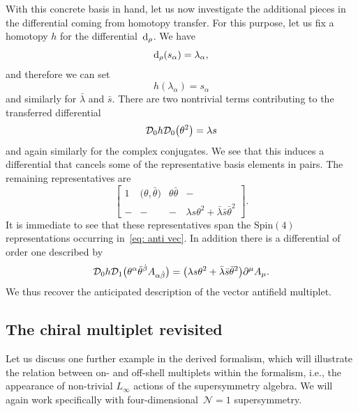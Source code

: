 \documentclass[pdftex]{sigma}
\numberwithin{equation}{section}
\def\d{{\rm d}}
\begin{document}
With this concrete basis in hand, let us now investigate the additional pieces in the differential coming from homotopy transfer. For this purpose, let us fix a homotopy $h$ for the differential~$\d_\rho$. We have
\begin{equation*}
\d_\rho (s_\alpha) = \lambda_\alpha ,
\end{equation*}
and therefore we can set
\begin{equation*}
h(\lambda_\alpha) = s_\alpha
\end{equation*}
and similarly for $\bar{\lambda}$ and $\bar{s}$. There are two nontrivial terms contributing to the transferred differential
\begin{equation*}
\mathcal D_0 h \mathcal D_0 \big(\theta^2\big) = \lambda s
\end{equation*}
and again similarly for the complex conjugates. We see that this induces a differential that cancels some of the representative basis elements in pairs. The remaining representatives are
\begin{equation*} %
\begin{bmatrix}
1 & \big(\theta,\bar{\theta}\big) & \theta \bar{\theta} & -\\
- & - & - & \lambda s \theta^2 + \bar{\lambda} \bar{s} \bar{\theta}^2
\end{bmatrix}.
\end{equation*}
It is immediate to see that these representatives span the $\mathrm{Spin}(4)$ representations occurring in~\eqref{eq: anti vec}. In addition there is a differential of order one described by
\begin{equation*}
\mathcal D_0 h \mathcal D_1 \big(\theta^\alpha \bar{\theta}^{\dot{\beta}} A_{\alpha \dot{\beta}} \big) = \big(\lambda s \theta^2 + \bar{\lambda} \bar{s} \bar{\theta}^2\big) \partial^\mu A_\mu .
\end{equation*}
We thus recover the anticipated description of the vector antifield multiplet.

\subsection{The chiral multiplet revisited}
Let us discuss one further example in the derived formalism, which will illustrate the relation between on- and off-shell multiplets within the formalism, i.e., the appearance of non-trivial $L_\infty$ actions of the supersymmetry algebra. We will again work specifically with four-dimensional~$\mathcal N=1$ supersymmetry.
\end{document}
